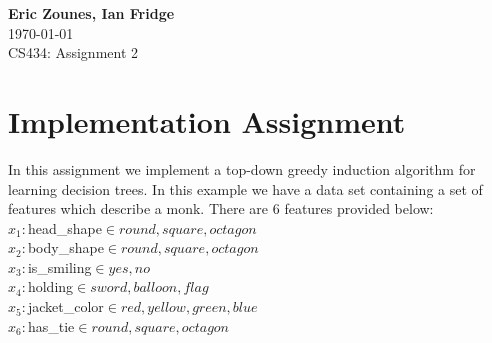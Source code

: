 \documentclass[12pt,letterpaper]{article}
\begin{document}
\setcounter{subsection}{1} 
\begin{flushright}
\end{flushright}
\begin{flushleft}
\textbf{Eric Zounes, Ian Fridge} \\
\today \\ 
CS434: Assignment 2 
\end{flushleft}
\section[1.]{Implementation Assignment} 
In this assignment we implement a top-down greedy induction algorithm for learning decision trees. In this example we have a data set containing a set of features which describe a monk. There are 6 features provided below: \\
$ x_{1}: $head\_shape$	\in round, square, octagon$ \\
$ x_{2}: $body\_shape$ 	\in round, square, octagon$ \\
$ x_{3}: $is\_smiling$	\in yes, no$ \\
$ x_{4}: $holding$	\in sword, balloon, flag$ \\
$ x_{5}: $jacket\_color$	\in red, yellow, green, blue$ \\
$ x_{6}: $has\_tie$	\in round, square, octagon$ \\
\end{document}
